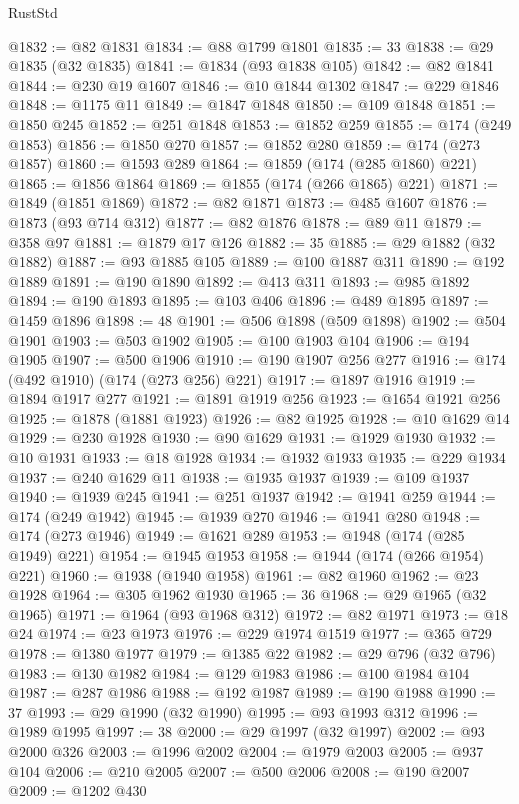 \begin{lexlean}{RustStd}
\begin{coremodule}
@1832 := @82 @1831
@1834 := @88 @1799 @1801
@1835 := 33
@1838 := @29 @1835 (@32 @1835)
@1841 := @1834 (@93 @1838 @105)
@1842 := @82 @1841
@1844 := @230 @19 @1607
@1846 := @10 @1844 @1302
@1847 := @229 @1846
@1848 := @1175 @11
@1849 := @1847 @1848
@1850 := @109 @1848
@1851 := @1850 @245
@1852 := @251 @1848
@1853 := @1852 @259
@1855 := @174 (@249 @1853)
@1856 := @1850 @270
@1857 := @1852 @280
@1859 := @174 (@273 @1857)
@1860 := @1593 @289
@1864 := @1859 (@174 (@285 @1860) @221)
@1865 := @1856 @1864
@1869 := @1855 (@174 (@266 @1865) @221)
@1871 := @1849 (@1851 @1869)
@1872 := @82 @1871
@1873 := @485 @1607
@1876 := @1873 (@93 @714 @312)
@1877 := @82 @1876
@1878 := @89 @11
@1879 := @358 @97
@1881 := @1879 @17 @126
@1882 := 35
@1885 := @29 @1882 (@32 @1882)
@1887 := @93 @1885 @105
@1889 := @100 @1887 @311
@1890 := @192 @1889
@1891 := @190 @1890
@1892 := @413 @311
@1893 := @985 @1892
@1894 := @190 @1893
@1895 := @103 @406
@1896 := @489 @1895
@1897 := @1459 @1896
@1898 := 48
@1901 := @506 @1898 (@509 @1898)
@1902 := @504 @1901
@1903 := @503 @1902
@1905 := @100 @1903 @104
@1906 := @194 @1905
@1907 := @500 @1906
@1910 := @190 @1907 @256 @277
@1916 := @174 (@492 @1910) (@174 (@273 @256) @221)
@1917 := @1897 @1916
@1919 := @1894 @1917 @277
@1921 := @1891 @1919 @256
@1923 := @1654 @1921 @256
@1925 := @1878 (@1881 @1923)
@1926 := @82 @1925
@1928 := @10 @1629 @14
@1929 := @230 @1928
@1930 := @90 @1629
@1931 := @1929 @1930
@1932 := @10 @1931
@1933 := @18 @1928
@1934 := @1932 @1933
@1935 := @229 @1934
@1937 := @240 @1629 @11
@1938 := @1935 @1937
@1939 := @109 @1937
@1940 := @1939 @245
@1941 := @251 @1937
@1942 := @1941 @259
@1944 := @174 (@249 @1942)
@1945 := @1939 @270
@1946 := @1941 @280
@1948 := @174 (@273 @1946)
@1949 := @1621 @289
@1953 := @1948 (@174 (@285 @1949) @221)
@1954 := @1945 @1953
@1958 := @1944 (@174 (@266 @1954) @221)
@1960 := @1938 (@1940 @1958)
@1961 := @82 @1960
@1962 := @23 @1928
@1964 := @305 @1962 @1930
@1965 := 36
@1968 := @29 @1965 (@32 @1965)
@1971 := @1964 (@93 @1968 @312)
@1972 := @82 @1971
@1973 := @18 @24
@1974 := @23 @1973
@1976 := @229 @1974 @1519
@1977 := @365 @729
@1978 := @1380 @1977
@1979 := @1385 @22
@1982 := @29 @796 (@32 @796)
@1983 := @130 @1982
@1984 := @129 @1983
@1986 := @100 @1984 @104
@1987 := @287 @1986
@1988 := @192 @1987
@1989 := @190 @1988
@1990 := 37
@1993 := @29 @1990 (@32 @1990)
@1995 := @93 @1993 @312
@1996 := @1989 @1995
@1997 := 38
@2000 := @29 @1997 (@32 @1997)
@2002 := @93 @2000 @326
@2003 := @1996 @2002
@2004 := @1979 @2003
@2005 := @937 @104
@2006 := @210 @2005
@2007 := @500 @2006
@2008 := @190 @2007
@2009 := @1202 @430

\end{coremodule}
\end{lexlean}
